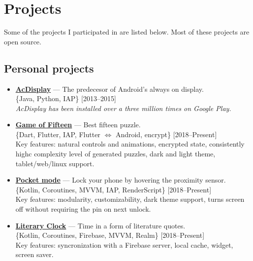 \documentclass[a4paper]{article}
\begin{document}
	\section*{Projects}
	Some of the projects I participated in are listed below. Most of these projects are open source.
	\subsection*{Personal projects}
	\begin{itemize}
		\item \faAndroid \enskip \href{http://artemchep.com/acdisplay/}{\textbf{AcDisplay}} --- The predecesor of Android's always on display. \\[0.2em]
		{\footnotesize \{Java, Python, IAP\} \hfill [2013--2015]} \\[0.2em]
		\textit{AcDisplay has been installed over a three million times on Google Play.} 

		\item \faAndroid \enskip \faChrome \enskip \faLinux \enskip \href{https://github.com/AChep/15puzzle}{\textbf{Game of Fifteen}} --- Best fifteen puzzle. \\[0.2em]
		{\footnotesize \{Dart, Flutter, IAP, Flutter $\Leftrightarrow$ Android, encrypt\} \hfill [2018--Present]} \\[0.2em]
		Key features: natural controls and animations, encrypted state, consistently highc complexity level of generated puzzles, dark and light theme, tablet/web/linux support. 
		
		\item \faAndroid \enskip \href{https://github.com/AChep/PocketMode}{\textbf{Pocket mode}} --- Lock your phone by hovering the proximity sensor. \\[0.2em]
		{\footnotesize \{Kotlin, Coroutines, MVVM, IAP, RenderScript\} \hfill [2018--Present]} \\[0.2em]
		Key features: modularity, customizability, dark theme support, turns screen off without requiring the pin on next unlock.   
		
		\item \faAndroid \enskip \href{https://github.com/AChep/literaryclock}{\textbf{Literary Clock}} --- Time in a form of literature quotes. \\[0.2em]
		{\footnotesize \{Kotlin, Coroutines, Firebase, MVVM, Realm\} \hfill [2018--Present]} \\[0.2em]
		Key features: syncronization with a Firebase server, local cache, widget, screen saver.  
			

\end{itemize}
\end{document}
